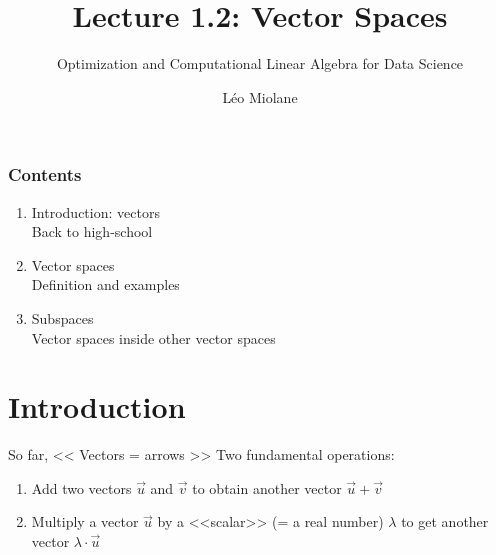 \documentclass{beamer}
\title{Lecture 1.2: Vector Spaces}
\subtitle{Optimization and Computational Linear Algebra for Data Science}
\author{Léo Miolane}
\date{}
\begin{document}
\setcounter{showProgressBar}{0}
\setcounter{showSlideNumbers}{0}

\frame{\titlepage}

\begin{frame}
	\frametitle{Contents}
	\begin{enumerate}
		\item Introduction: vectors \\ \textcolor{ExecusharesGrey}{\footnotesize\hspace{1em} Back to high-school}
			\vspace{0.3cm}
		\item Vector spaces  \\ \textcolor{ExecusharesGrey}{\footnotesize\hspace{1em} Definition and examples}
			\vspace{0.3cm}
		\item Subspaces \\ \textcolor{ExecusharesGrey}{\footnotesize\hspace{1em} Vector spaces inside other vector spaces}
	\end{enumerate}
\end{frame}


\setcounter{framenumber}{0}
\setcounter{showSlideNumbers}{1}

\section{Introduction}

\begin{frame}[t]{So far, << Vectors = arrows >>}
	\noindent Two fundamental operations:
	\vspace{0.1cm}
	\begin{enumerate}
		\item Add two vectors $\vec{u}$ and $\vec{v}$ to obtain another vector $\vec{u} + \vec{v}$
			\vspace{2.8cm}
		\item Multiply a vector $\vec{u}$ by a <<scalar>> (= a real number) $\lambda$ to get another vector $\lambda \cdot \vec{u}$
			\vspace{2.3cm}
	\end{enumerate}
\end{frame}
\end{document}
